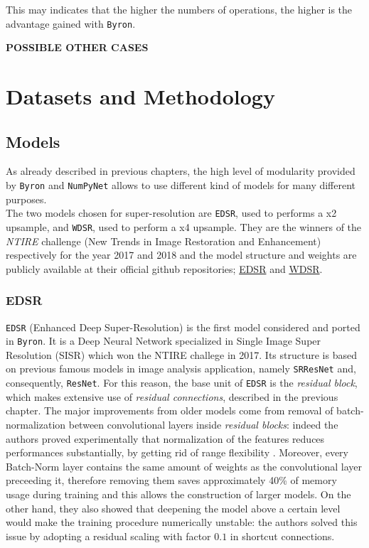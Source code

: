 \documentclass[12pt,a4paper]{report}
\begin{document}
This may indicates that the higher the numbers of operations, the higher is the advantage gained with {\tt Byron}.

{\bf POSSIBLE OTHER CASES}



\chapter{Datasets and Methodology}

\section{Models}

As already described in previous chapters, the high level of modularity provided by \texttt{Byron} and \texttt{NumPyNet} allows to use different kind of models for many different purposes. \\ The two models chosen for super-resolution are {\tt EDSR}, used to performs a x2 upsample, and {\tt WDSR}, used to perform a x4 upsample. 
They are the winners of the {\it NTIRE} challenge (New Trends in Image Restoration and Enhancement) respectively for the year 2017 and 2018 and the model structure and weights are publicly available at their official github repositories; \href{https://github.com/thstkdgus35/EDSR-PyTorch}{EDSR} and \href{https://github.com/JiahuiYu/wdsr_ntire2018}{WDSR}.

\subsection*{EDSR}

{\tt EDSR} (Enhanced Deep Super-Resolution) \cite{edsr} is the first model considered and ported in {\tt Byron}. 
It is a Deep Neural Network specialized in Single Image Super Resolution (SISR) which won the NTIRE challege in 2017.
Its structure is based on previous famous models in image analysis application, namely {\tt SRResNet} and, consequently, {\tt ResNet}. 
For this reason, the base unit of {\tt EDSR} is the {\it residual block}, which makes extensive use of {\it residual connections}, described in the previous chapter.
The major improvements from older models come from removal of batch-normalization between convolutional layers inside {\it residual blocks}: indeed the authors proved experimentally that normalization of the features reduces performances substantially, by getting rid of range flexibility \cite{edsr}. 
Moreover, every Batch-Norm layer contains the same amount of weights as the convolutional layer preceeding it, therefore removing them saves approximately 40\% of memory usage during training and this allows the construction of larger models.
On the other hand, they also showed that deepening the model above a certain level would make the training procedure numerically unstable: the authors solved this issue by adopting a residual scaling with factor $0.1$ in shortcut connections. 
 
\end{document}
